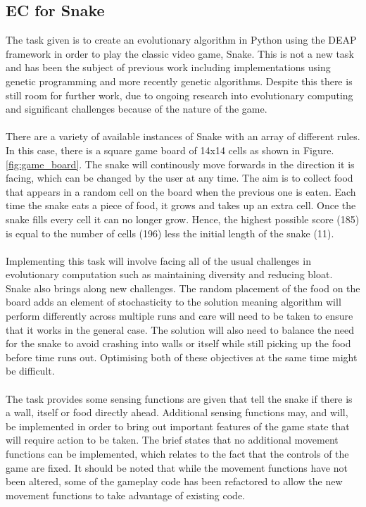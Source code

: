 \documentclass[12pt]{article}
\begin{document}
\subsection{EC for Snake}
The task given is to create an evolutionary algorithm in Python using the DEAP framework in order to play the classic video game, Snake. This is not a new task and has been the subject of previous work including implementations using genetic programming\cite{snake_blog} and more recently genetic algorithms\cite{snake_paper}. Despite this there is still room for further work, due to ongoing research into evolutionary computing and significant challenges because of the nature of the game.
\\\\
There are a variety of available instances of Snake with an array of different rules. In this case, there is a square game board of 14x14 cells as shown in Figure. \ref{fig:game_board}. The snake will continously move forwards in the direction it is facing, which can be changed by the user at any time. The aim is to collect food that appears in a random cell on the board when the previous one is eaten. Each time the snake eats a piece of food, it grows and takes up an extra cell. Once the snake fills every cell it can no longer grow. Hence, the highest possible score (185) is equal to the number of cells (196) less the initial length of the snake (11).
\\\\
Implementing this task will involve facing all of the usual challenges in evolutionary computation such as maintaining diversity and reducing bloat. Snake also brings along new challenges. The random placement of the food on the board adds an element of stochasticity to the solution meaning algorithm will perform differently across multiple runs and care will need to be taken to ensure that it works in the general case. The solution will also need to balance the need for the snake to avoid crashing into walls or itself while still picking up the food before time runs out. Optimising both of these objectives at the same time might be difficult.
\\\\
The task provides some sensing functions are given that tell the snake if there is a wall, itself or food directly ahead. Additional sensing functions may, and will, be implemented in order to bring out important features of the game state that will require action to be taken. The brief states that no additional movement functions can be implemented, which relates to the fact that the controls of the game are fixed. It should be noted that while the movement functions have not been altered, some of the gameplay code has been refactored to allow the new movement functions to take advantage of existing code.
\end{document}
